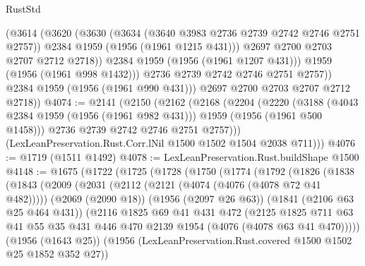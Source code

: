 \begin{lexlean}{RustStd}
\begin{coremodule}
                  (@3614
                    (@3620
                      (@3630
                        (@3634 (@3640 @3983 @2736 @2739 @2742 @2746 @2751 @2757))
                        @2384
                        @1959
                        (@1956 (@1961 @1215 @431)))
                      @2697
                      @2700
                      @2703
                      @2707
                      @2712
                      @2718))
                  @2384
                  @1959
                  (@1956 (@1961 @1207 @431)))
                @1959
                (@1956 (@1961 @998 @1432)))
              @2736
              @2739
              @2742
              @2746
              @2751
              @2757))
          @2384
          @1959
          (@1956 (@1961 @990 @431)))
        @2697
        @2700
        @2703
        @2707
        @2712
        @2718))
@4074 := @2141
    (@2150
      (@2162
        (@2168
          (@2204
            (@2220
              (@3188 (@4043 @2384 @1959 (@1956 (@1961 @982 @431))) @1959 (@1956 (@1961 @500 @1458)))
              @2736
              @2739
              @2742
              @2746
              @2751
              @2757)))
        (LexLeanPreservation.Rust.Corr.lNil @1500 @1502 @1504 @2038 @711)))
@4076 := @1719 (@1511 @1492)
@4078 := LexLeanPreservation.Rust.buildShape @1500
@4148 := @1675
    (@1722
      (@1725
        (@1728
          (@1750
            (@1774
              (@1792
                (@1826
                  (@1838
                    (@1843
                      (@2009
                        (@2031
                          (@2112 (@2121 (@4074 (@4076 (@4078 @72 @41 @482)))))
                          (@2069 (@2090 @18))
                          (@1956 (@2097 @26 @63))
                          (@1841 (@2106 @63 @25 @464 @431))
                          (@2116
                            @1825
                            @69
                            @41
                            @431
                            @472
                            (@2125
                              @1825
                              @711
                              @63
                              @41
                              @55
                              @35
                              @431
                              @446
                              @470
                              @2139
                              @1954
                              (@4076 (@4078 @63 @41 @470)))))
                        (@1956 (@1643 @25))
                        (@1956 (LexLeanPreservation.Rust.covered @1500 @1502 @25 @1852 @352 @27))

\end{coremodule}
\end{lexlean}
